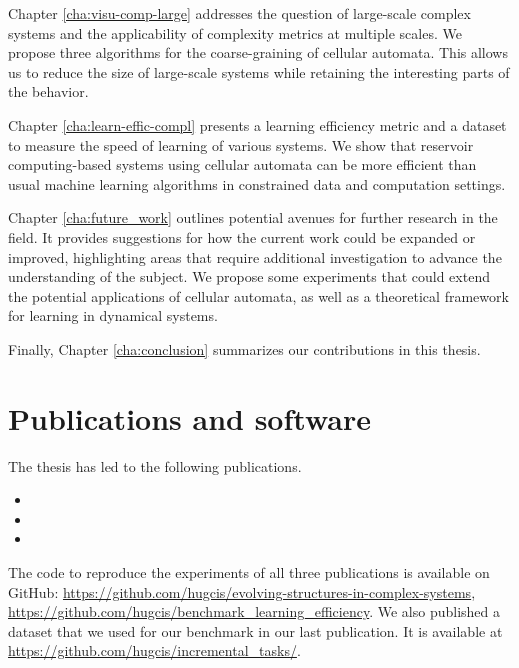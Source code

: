 Chapter \ref{cha:visu-comp-large} addresses the question of large-scale complex
systems and the applicability of complexity metrics at multiple scales. We
propose three algorithms for the coarse-graining of cellular automata. This allows
us to reduce the size of large-scale systems while retaining the interesting parts
of the behavior.

Chapter \ref{cha:learn-effic-compl} presents a learning efficiency metric and a
dataset to measure the speed of learning of various systems. We show that
reservoir computing-based systems using cellular automata can be more efficient
than usual machine learning algorithms in constrained data and computation
settings.

Chapter \ref{cha:future_work} outlines potential avenues for further research in 
the field. It provides suggestions for how the current work could be expanded or 
improved, highlighting areas that require additional investigation to advance the 
understanding of the subject. We propose some experiments that could extend the 
potential applications of cellular automata, as well as a theoretical framework 
for learning in dynamical systems.

Finally, Chapter \ref{cha:conclusion} summarizes our contributions in this thesis. 

\section{Publications and software}

The thesis has led to the following publications.

\begin{itemize}
  \item {}
  \item {}
  \item {}
\end{itemize}

The code to reproduce the experiments of all three publications is available on
GitHub: \url{https://github.com/hugcis/evolving-structures-in-complex-systems},
\url{https://github.com/hugcis/benchmark_learning_efficiency}. We also published a
dataset that we used for our benchmark in our last
publication. It is available at
\url{https://github.com/hugcis/incremental_tasks/}.
